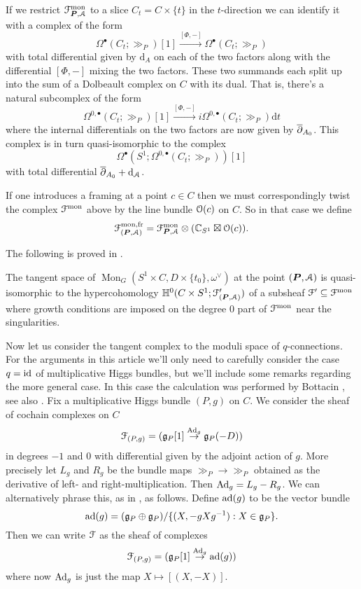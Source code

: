\documentclass[10pt, oneside]{article}
\DeclareMathOperator{\mon}{Mon}
\renewcommand{\d}{\mathrm{d}}
\renewcommand{\ad}{\mr{ad}}
\newcommand{\Ad}{\mr{Ad}}
\begin{document}
\begin{remark} \label{monopole_holo_restriction_rmk}
If we restrict $\mathcal{F}^{\mathrm{mon}}_{\boldsymbol{P}, \mathcal{A}}$ to a slice $C_t = C \times \{t\}$ in the $t$-direction we can identify it with a complex of the form
\[\Omega^\bullet(C_t; \gg_P)[1] \overset {[\Phi,-]} \to \Omega^\bullet(C_t; \gg_P)\]
with total differential given by $\d_A$ on each of the two factors along with the differential $[\Phi,-]$ mixing the two factors.  These two summands each split up into the sum of a Dolbeault complex on $C$ with its dual.  That is, there's a natural subcomplex of the form
\[\Omega^{0,\bullet}(C_t; \gg_P)[1] \overset {[\Phi,-]} \to i \Omega^{0,\bullet}(C_t; \gg_P) \d t\]
where the internal differentials on the two factors are now given by $\overline{\partial}_{A_0}$.  This complex is in turn quasi-isomorphic to the complex
\[\Omega^\bullet(S^1; \Omega^{0,\bullet}(C_t;\gg_P))[1]\]
with total differential $\ol \dd_{A_0} + \d_{\mc A}$.
\end{remark}

\begin{remark}
If one introduces a framing at a point $c \in C$ then we must correspondingly twist the complex $\mathcal{F}^{\mathrm{mon}}$ above by the line bundle $\mathcal{O}(c)$ on $C$.  So in that case we define 
\[\mathcal{F}^{\text{mon,fr}}_{(\boldsymbol{P},\mathcal{A})} = \mathcal{F}^{\mathrm{mon}}_{\boldsymbol{P}, \mathcal{A}} \otimes (\mathbb{C}_{S^1} \boxtimes \mathcal{O}(c)).\]
\end{remark}

The following is proved in \cite{FoscoloDef}.
 
\begin{prop}
The tangent space of $\mon_G(S^1 \times C, D \times \{t_0\}, \omega^\vee)$ at the point $(\boldsymbol{P},\mathcal{A})$ is quasi-isomorphic to the hypercohomology $\mathbb{H}^0(C \times S^1; \mathcal{F}'_{(\boldsymbol{P},\mathcal{A})})$ of a subsheaf $\mathcal{F}' \subseteq \mathcal{F}^{\mathrm{mon}}$ where growth conditions are imposed on the degree 0 part of $\mathcal{F}^{\mathrm{mon}}$ near the singularities.
\end{prop}

Now let us consider the tangent complex to the moduli space of $q$-connections.  For the arguments in this article we'll only need to carefully consider the case $q=\operatorname{id}$ of multiplicative Higgs bundles, but we'll include some remarks regarding the more general case.  In this case the calculation was performed by Bottacin \cite{Bottacin}, see also \cite[Section 4]{HurtubiseMarkman}. Fix a multiplicative Higgs bundle $(P,g)$ on $C$.  We consider the sheaf of cochain complexes on $C$
\[\mc F_{(P,g)} = (\gg_P[1] \overset {\Ad_g} {\to} \gg_P(-D))\]
in degrees $-1$ and 0 with differential given by the adjoint action of $g$.  More precisely let $L_g$ and $R_g$ be the bundle maps $\gg_P \to \gg_P$ obtained as the derivative of left- and right-multiplication.  Then $\Ad_g = L_g - R_g$.  We can alternatively phrase this, as in \cite[Section 4]{HurtubiseMarkman}, as follows.  Define $\ad(g)$ to be the vector bundle
\[\ad(g) = (\gg_P \oplus \gg_P)/\{(X, -g X g^{-1}): X \in \gg_P\}.\]
Then we can write $\mathcal{F}$ as the sheaf of complexes
\[\mc F_{(P,g)} = (\gg_P[1] \overset {\Ad_g} {\to} \ad(g))\]
where now $\Ad_g$ is just the map $X \mapsto [(X,-X)]$.
\end{document}
